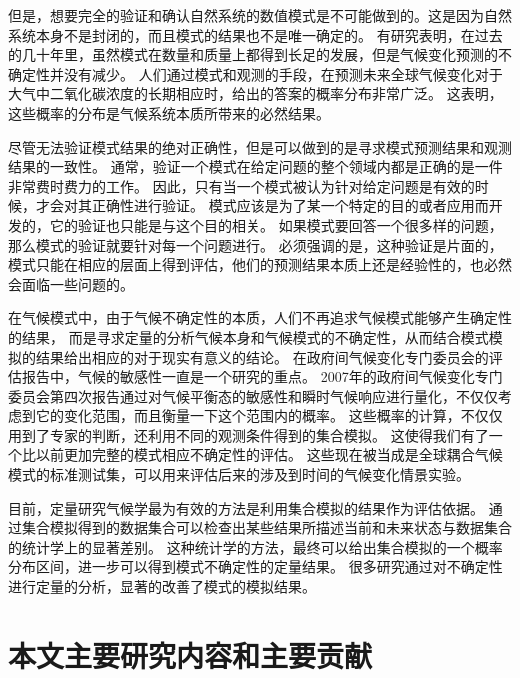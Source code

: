 但是，想要完全的验证和确认自然系统的数值模式是不可能做到的。这是因为自然系统本身不是封闭的，而且模式的结果也不是唯一确定的\cite{oreskes1994verification}。
有研究表明，在过去的几十年里，虽然模式在数量和质量上都得到长足的发展，但是气候变化预测的不确定性并没有减少。 
人们通过模式和观测的手段，在预测未来全球气候变化对于大气中二氧化碳浓度的长期相应时，给出的答案的概率分布非常广泛。
这表明，这些概率的分布是气候系统本质所带来的必然结果\cite{roe2007climate}。 

尽管无法验证模式结果的绝对正确性，但是可以做到的是寻求模式预测结果和观测结果的一致性。
通常，验证一个模式在给定问题的整个领域内都是正确的是一件非常费时费力的工作。 
因此，只有当一个模式被认为针对给定问题是有效的时候，才会对其正确性进行验证。 
模式应该是为了某一个特定的目的或者应用而开发的，它的验证也只能是与这个目的相关\cite{sargent2005verification}。
如果模式要回答一个很多样的问题，那么模式的验证就要针对每一个问题进行。
必须强调的是，这种验证是片面的，模式只能在相应的层面上得到评估，他们的预测结果本质上还是经验性的，也必然会面临一些问题的。


在气候模式中，由于气候不确定性的本质，人们不再追求气候模式能够产生确定性的结果，
而是寻求定量的分析气候本身和气候模式的不确定性，从而结合模式模拟的结果给出相应的对于现实有意义的结论。
在政府间气候变化专门委员会的评估报告中，气候的敏感性一直是一个研究的重点。
2007年的政府间气候变化专门委员会第四次报告通过对气候平衡态的敏感性和瞬时气候响应进行量化，不仅仅考虑到它的变化范围，而且衡量一下这个范围内的概率。
这些概率的计算，不仅仅用到了专家的判断，还利用不同的观测条件得到的集合模拟。 
这使得我们有了一个比以前更加完整的模式相应不确定性的评估。 
这些现在被当成是全球耦合气候模式的标准测试集，可以用来评估后来的涉及到时间的气候变化情景实验\cite{meehl2007global}。 
 
目前，定量研究气候学最为有效的方法是利用集合模拟的结果作为评估依据\cite{von2013testing,reynolds1994random, allen2002towards}。
通过集合模拟得到的数据集合可以检查出某些结果所描述当前和未来状态与数据集合的统计学上的显著差别。
这种统计学的方法，最终可以给出集合模拟的一个概率分布区间，进一步可以得到模式不确定性的定量结果。
很多研究通过对不确定性进行定量的分析，显著的改善了模式的模拟结果\cite{reynolds1994random}。


\section{本文主要研究内容和主要贡献}
